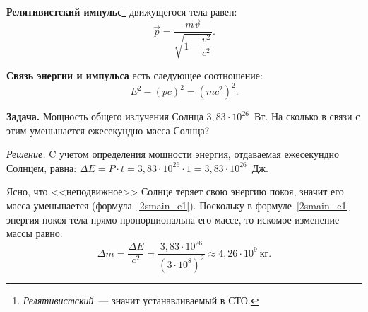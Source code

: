 \documentclass[main.tex]{subfiles}
\begin{document}
\textbf{Релятивистский импульс}\footnote{\emph{Релятивистский}~--- значит устанавливаемый в СТО.} движущегося тела равен:
\begin{equation}
    \vec p=\frac{m\vec v}{\sqrt{1-\dfrac{v^2}{c^2}}}.
\end{equation}

\textbf{Связь энергии и импульса} есть следующее соотношение:
\begin{equation}
    E^2-\left(pc\right)^2=\left(mc^2\right)^2.
\end{equation}

\medskip

\noindent\textbf{Задача.} Мощность общего излучения Солнца $3{,}83\cdot10^{26}$~Вт. На сколько в связи с этим уменьшается ежесекундно масса Солнца?

\smallskip

\noindent\emph{Решение.} C учетом определения мощности энергия, отдаваемая ежесекундно Солнцем, равна: $\Delta E=P\cdot t=3{,}83\cdot10^{26}\cdot1=3{,}83\cdot10^{26}$~Дж.

Ясно, что <<неподвижное>> Солнце теряет свою энергию покоя, значит его масса уменьшается (формула~\eqref{2smain_e1}). Поскольку в формуле~\eqref{2smain_e1} энергия покоя тела прямо пропорциональна его массе, то искомое изменение массы равно:
\begin{equation*}
    \Delta m=\frac{\Delta E}{c^2}=\frac{3{,}83\cdot10^{26}}{(3\cdot10^8)^2}\approx4{,}26\cdot10^9~\text{кг}.
\end{equation*}
\end{document}

